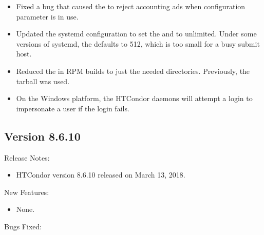 \begin{itemize}
\item Fixed a bug that caused the  to reject
accounting ads when configuration parameter
 is in use.

\item Updated the systemd configuration to set the  and 
to unlimited. Under some versions of systemd, the  defaults to 512,
which is too small for a busy submit host.

\item Reduced the  in RPM builds to just the needed directories.
Previously, the tarball  was used.

\item On the Windows platform, the HTCondor daemons will attempt a 
login to impersonate a user if the  login fails.

\end{itemize}

\subsection*{\label{sec:New-8-6-10}Version 8.6.10}

\noindent Release Notes:

\begin{itemize}

\item HTCondor version 8.6.10 released on March 13, 2018.

\end{itemize}


\noindent New Features:

\begin{itemize}

\item None.

\end{itemize}

\noindent Bugs Fixed:

